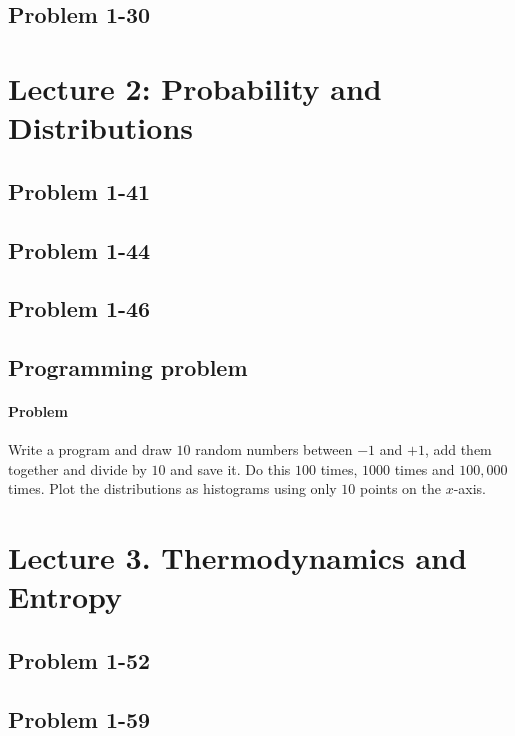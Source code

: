 \documentclass[reprint]{revtex4-1}
\numberwithin{equation}{section}
\begin{document}
\subsection{Problem 1-30}


\section{Lecture 2: Probability and Distributions}

\subsection{Problem 1-41}

\subsection{Problem 1-44}

\subsection{Problem 1-46}

\subsection{Programming problem}

\paragraph*{Problem}

Write a program and draw $10$ random numbers between $-1$ and $+1$,
add them together and divide by $10$ and save it.
Do this $100$ times, $1000$ times and $100,000$ times.
Plot the distributions as histograms using only $10$ points on the $x$-axis.


\section{Lecture 3. Thermodynamics and Entropy}

\subsection{Problem 1-52}

\subsection{Problem 1-59}
\end{document}
